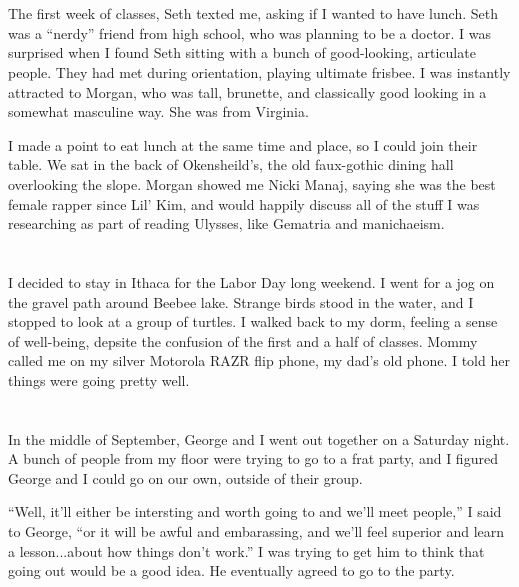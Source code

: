 \section{}

The first week of classes, Seth texted me, asking if I wanted to have lunch.
Seth was a ``nerdy'' friend from high school, who was planning to be a doctor.
I was surprised when I found Seth sitting with a bunch of good-looking,
articulate people. They had met during orientation, playing ultimate frisbee.  I
was instantly attracted to Morgan, who was tall, brunette, and classically good
looking in a somewhat masculine way.  She was from Virginia. 

I made a point to eat lunch at the same time and place, so I could join their
table.  We sat in the back of Okensheild's, the old faux-gothic dining hall
overlooking the slope.  Morgan showed me Nicki Manaj, saying she was the best
female rapper since Lil' Kim, and would happily discuss all of the stuff I was
researching as part of reading Ulysses, like Gematria and manichaeism.

\section{}

I decided to stay in Ithaca for the Labor Day long weekend.  I went for a jog on
the gravel path around Beebee lake.  Strange birds stood in the water, and I
stopped to look at a group of turtles.  I walked back to my dorm, feeling a
sense of well-being, depsite the confusion of the first and a half of classes.
Mommy called me on my silver Motorola RAZR flip phone, my dad's old phone.  I
told her things were going pretty well. 

\section{}

In the middle of September, George and I went out together on a Saturday night.
A bunch of people from my floor were trying to go to a frat party, and I figured
George and I could go on our own, outside of their group.  

``Well, it'll either be intersting and worth going to and we'll meet people,''
I said to George, ``or it will be awful and embarassing, and we'll feel
superior and learn a lesson...about how things don't work.''  I was trying to
get him to think that going out would be a good idea.  He eventually agreed to
go to the party.


